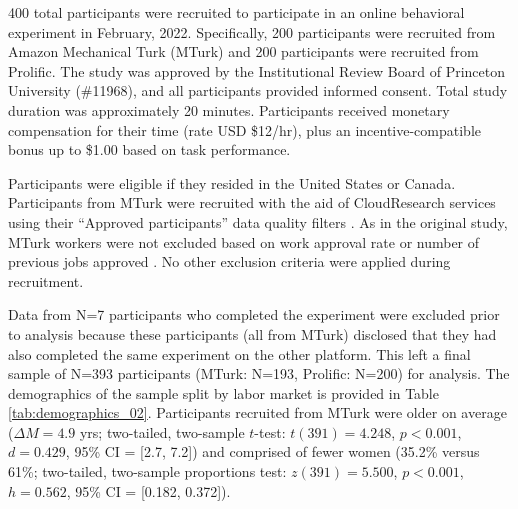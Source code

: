 \documentclass[a4paper,notitlepage,12pt]{article}
\begin{document}
\begin{refsection}[supp]
400 total participants were recruited to participate in an online behavioral experiment in February, 2022. Specifically, 200 participants were recruited from Amazon Mechanical Turk (MTurk) and 200 participants were recruited from Prolific. The study was approved by the Institutional Review Board of Princeton University (\#11968), and all participants provided informed consent. Total study duration was approximately 20 minutes. Participants received monetary compensation for their time (rate USD \$12/hr), plus an incentive-compatible bonus up to \$1.00 based on task performance. 

Participants were eligible if they resided in the United States or Canada. Participants from MTurk were recruited with the aid of CloudResearch services \cite{litman2017turkprime-2} using their ``Approved participants''  data quality filters \cite{cloudresearch_2020-2}. As in the original study, MTurk workers were not excluded based on work approval rate or number of previous jobs approved \cite{robinson2019tapped-2}. No other exclusion criteria were applied during recruitment.

Data from N=7 participants who completed the experiment were excluded prior to analysis because these participants (all from MTurk) disclosed that they had also completed the same experiment on the other platform. This left a final sample of N=393 participants (MTurk: N=193, Prolific: N=200) for analysis. The demographics of the sample split by labor market is provided in Table \ref{tab:demographics_02}. Participants recruited from MTurk were older on average ($\Delta M = 4.9$ yrs; two-tailed, two-sample $t$-test: $t(391)=4.248$, $p<0.001$, $d = 0.429$, 95\% CI = [2.7, 7.2]) and comprised of fewer women (35.2\% versus 61\%; two-tailed, two-sample proportions test: $z(391)=5.500$, $p<0.001$, $h=0.562$, 95\% CI = [0.182, 0.372]). 


\end{refsection}
\end{document}
